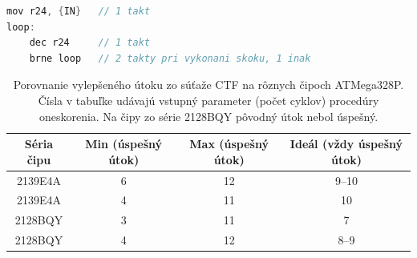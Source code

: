 \begin{lstlisting}[float,language=C,caption={Jednoduchá procedúra oneskorenia v asembleri. \{IN\} označuje vstupný parameter -- 8-bitová konštanta, alebo hodnota v registeri.},label=alg:asmDelay]
mov r24, {IN}   // 1 takt
loop:
    dec r24     // 1 takt
    brne loop   // 2 takty pri vykonani skoku, 1 inak
\end{lstlisting}

\begin{table}
    \caption[Porovnanie vylepšeného útoku zo súťaže CTF na rôznych čipoch ATMega328P.]{Porovnanie vylepšeného útoku zo súťaže CTF na rôznych čipoch ATMega328P. Čísla v tabuľke udávajú vstupný parameter (počet cyklov) procedúry oneskorenia. Na čipy zo série 2128BQY pôvodný útok nebol úspešný.}
    \label{tab:vccOnTheCheap2}
    \begin{center}
    \begin{tabular}{|c|c|c|c|}
        \hline 
        Séria čipu & Min (úspešný útok) & Max (úspešný útok) & Ideál (vždy úspešný útok) \\
        \hline
        2139E4A & 6 & 12 & 9--10 \\
        \hline
        2139E4A & 4 & 11 & 10 \\
        \hline
        2128BQY & 3 & 11 & 7 \\
        \hline
        2128BQY & 4 & 12 & 8--9 \\
        \hline
    \end{tabular}
    \end{center}
\end{table}